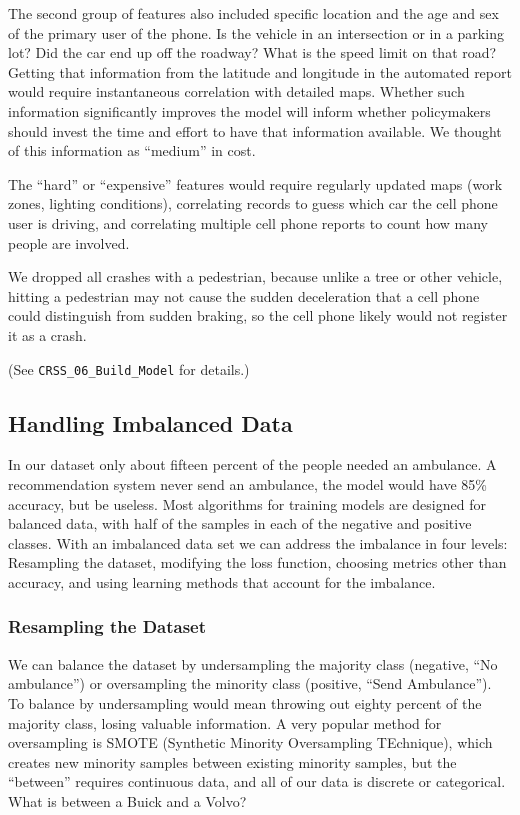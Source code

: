 The second group of features also included specific location and the age and sex of the primary user of the phone.  Is the vehicle in an intersection or in a parking lot?  Did the car end up off the roadway?  What is the speed limit on that road?  Getting that information from the latitude and longitude in the automated report would require instantaneous correlation with detailed maps.  Whether such information significantly improves the model will inform whether policymakers should invest the time and effort to have that information available.  We thought of this information as ``medium'' in cost.

The ``hard'' or ``expensive'' features would require regularly updated maps (work zones, lighting conditions), correlating records to guess which car the cell phone user is driving, and correlating multiple cell phone reports to count how many people are involved.  

We dropped all crashes with a pedestrian, because unlike a tree or other vehicle, hitting a pedestrian may not cause the sudden deceleration that a cell phone could distinguish from sudden braking, so the cell phone likely would not register it as a crash.  

(See \verb|CRSS_06_Build_Model| for details.)


\subsection{Handling Imbalanced Data}

In our dataset only about fifteen percent of the people needed an ambulance.   A recommendation system never send an ambulance, the model would have 85\% accuracy, but be useless.  Most algorithms for training models are designed for balanced data, with half of the samples in each of the negative and positive classes.  With an imbalanced data set we can address the imbalance in four levels:  Resampling the dataset, modifying the loss function, choosing metrics other than accuracy, and using learning methods that account for the imbalance.  

\subsubsection{Resampling the Dataset}

We can balance the dataset by undersampling the majority class (negative, ``No ambulance'') or oversampling the minority class (positive, ``Send Ambulance'').  To balance by undersampling would mean throwing out eighty percent of the majority class, losing valuable information.  A very popular method for oversampling is SMOTE (Synthetic Minority Oversampling TEchnique), which creates new minority samples between existing minority samples, but the ``between'' requires continuous data, and all of our data is discrete or categorical.  What is between a Buick and a Volvo?

